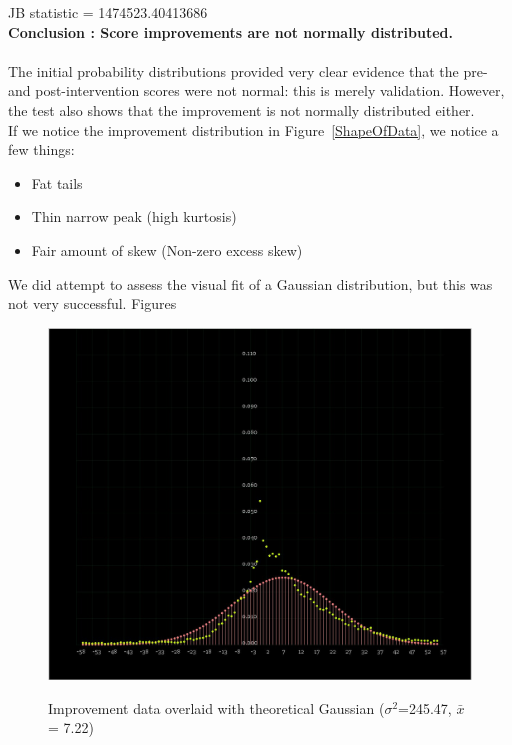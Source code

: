 \documentclass[10pt]{article}
\begin{document}
JB statistic = 1474523.40413686\\
\textbf{Conclusion : Score improvements are not normally distributed.}\\\\
The initial probability distributions provided very clear evidence that the pre- and post-intervention scores were not normal: this is merely validation. However, the test also shows that the improvement is not normally distributed either.\\
If we notice the improvement distribution in Figure~\ref{ShapeOfData}, we notice a few things:
\begin{itemize}
\item Fat tails
\item Thin narrow peak (high kurtosis)
\item Fair amount of skew (Non-zero excess skew)
\end{itemize}

We did attempt to assess the visual fit of a Gaussian distribution, but this was not very successful. Figures 

\begin{figure}
\caption{Improvement data overlaid with theoretical Gaussian (${\sigma}^2$=245.47, $\bar{x}$= 7.22)}
\label{ShapeOfImprovementWrtNormal}
\begin{center}
\includegraphics[width=120mm]{ReportMedia/ShapeOfImprovementWrtNormal.jpg}\\
\end{center}
\end{figure}
\end{document}
